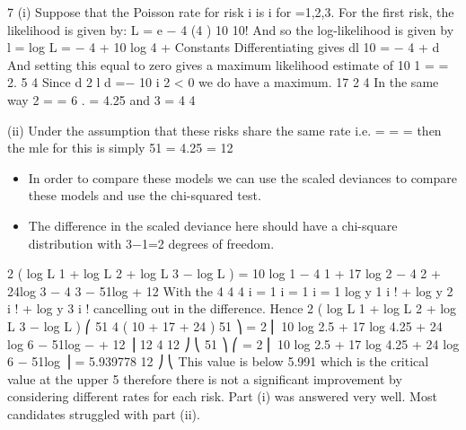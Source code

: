 \documentclass[a4paper,12pt]{article}
\begin{document}


7
(i)
Suppose that the Poisson rate for risk i is \lambda i for =1,2,3.
For the first risk, the likelihood is given by:
L = e − 4 
(4  ) 10
10!
And so the log-likelihood is given by
l = log L = − 4  + 10 log 4  + Constants
Differentiating gives
dl
10
= − 4 +
d 
And setting this equal to zero gives a maximum likelihood estimate of
10
\hat{\lambda} 1 =
= 2. 5
4
Since
d 2 l
d 
=−
10
\lambda i 2
< 0 we do have a maximum.
17
2 4
In the same way \hat{\lambda} 2 =
= 6 .
= 4.25 and \hat{\lambda} 3 =
4
4

(ii)
Under the assumption that these risks share the same rate i.e.  =  =  = \lambda
then the mle for this is simply
51
= 4.25
\hat{\lambda} =
12

\begin{itemize}
\item In order to compare these models we can use the scaled deviances to compare
these models and use the chi-squared test.
\item The difference in the scaled deviance here should have a chi-square
distribution with 3−1=2 degrees of freedom.
\end{itemize}
2 ( log L 1 + log L 2 + log L 3 − log L ) = 10 log \hat{\lambda} 1 − 4 \hat{\lambda} 1 + 17 log \hat{\lambda} 2 − 4 \hat{\lambda} 2 + 24log \hat{\lambda} 3 − 4 \hat{\lambda} 3 − 51log \hat{\lambda} + 12 \hat{\lambda}
With the
4 4 4
i = 1 i = 1 i = 1
\sum  log y 1 i ! + \sum  log y 2 i ! + \sum  log y 3 i ! cancelling out in the difference.
Hence
2 ( log L 1 + log L 2 + log L 3 − log L )
⎛
51 4 ( 10 + 17 + 24 )
51 ⎞
= 2 ⎜ 10 log 2.5 + 17 log 4.25 + 24 log 6 − 51log −
+ 12 ⎟
12
4
12 ⎠
⎝
51 ⎞
⎛
= 2 ⎜ 10 log 2.5 + 17 log 4.25 + 24 log 6 − 51log ⎟ = 5.939778
12 ⎠
⎝
This value is below 5.991 which is the critical value at the upper 5%
therefore there is not a significant improvement by considering different rates
for each risk.
Part (i) was answered very well. Most candidates struggled with part (ii).
\end{document}
